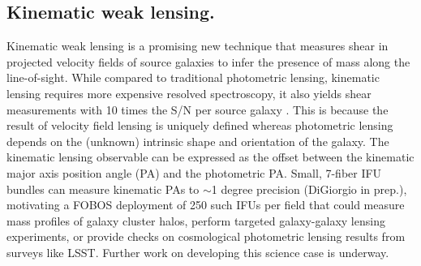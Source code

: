 \subsection{Kinematic weak lensing.}
\label{sec:kinematic_lensing}

Kinematic weak lensing is a promising new technique that measures shear in projected velocity fields of source galaxies to infer the presence of mass along the line-of-sight.  While compared to traditional photometric lensing, kinematic lensing requires more expensive resolved spectroscopy, it also yields shear measurements with 10 times the S/N per source galaxy \citep{huff13}.  This is because the result of velocity field lensing is uniquely defined whereas photometric lensing depends on the (unknown) intrinsic shape and orientation of the galaxy.  The kinematic lensing observable can be expressed as the offset between the kinematic major axis position angle (PA) and the photometric PA.  Small, 7-fiber IFU bundles can measure kinematic PAs to $\sim$1 degree precision (DiGiorgio in prep.), motivating a FOBOS deployment of 250 such IFUs per field that could measure mass profiles of galaxy cluster halos, perform targeted galaxy-galaxy lensing experiments, or provide checks on cosmological photometric lensing results from surveys like LSST.  Further work on developing this science case is underway. 



